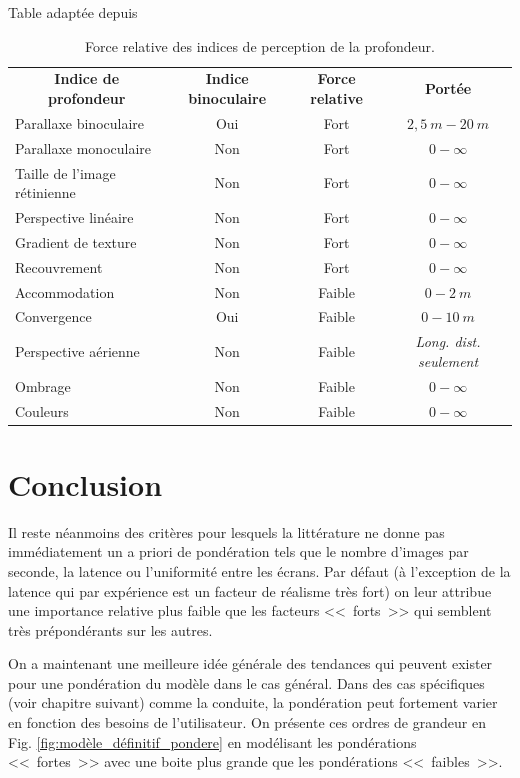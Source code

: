 \begin{table}[h]	
	\centering
	\caption{Force relative des indices de perception de la profondeur.}{Table adaptée depuis \citep{mehrabi_making_2013}}
	\label{tab:ponderation_depth_cues}
	\small
	\begin{tabular}{lccc}
		\multicolumn{1}{c}{\bfseries Indice de profondeur} & \multicolumn{1}{c}{\bfseries Indice binoculaire} & \multicolumn{1}{c}{\bfseries Force relative} & \multicolumn{1}{c}{\bfseries Portée}\\		
		Parallaxe binoculaire & Oui & Fort & $2,5~m - 20~m$\\
		Parallaxe monoculaire & Non & Fort & $0 - \infty$\\
		Taille de l'image rétinienne & Non & Fort & $0 - \infty$\\
		Perspective linéaire & Non & Fort & $0 - \infty$\\
		Gradient de texture & Non & Fort & $0 - \infty$\\
		Recouvrement & Non & Fort & $0 - \infty$\\
		Accommodation & Non & Faible & $0 - 2~m$\\
		Convergence & Oui & Faible & $0 - 10~m$\\
		Perspective aérienne & Non & Faible & \textit{Long. dist. seulement}\\
		Ombrage & Non & Faible & $0 - \infty$\\
		Couleurs & Non & Faible & $0 - \infty$\\
	\end{tabular}
\end{table}

\section{Conclusion}
\par Il reste néanmoins des critères pour lesquels la littérature ne donne pas immédiatement un a priori de pondération tels que le nombre d'images par seconde, la latence ou l'uniformité entre les écrans. Par défaut (à l'exception de la latence qui par expérience est un facteur de réalisme très fort) on leur attribue une importance relative plus faible que les facteurs <<~forts~>> qui semblent très prépondérants sur les autres.

\par On a maintenant une meilleure idée générale des tendances qui peuvent exister pour une pondération du modèle dans le cas général. Dans des cas spécifiques (voir chapitre suivant) comme la conduite, la pondération peut fortement varier en fonction des besoins de l'utilisateur. On présente ces ordres de grandeur en Fig. \ref{fig:modèle_définitif_pondere} en modélisant les pondérations <<~fortes~>> avec une boite plus grande que les pondérations <<~faibles~>>.

